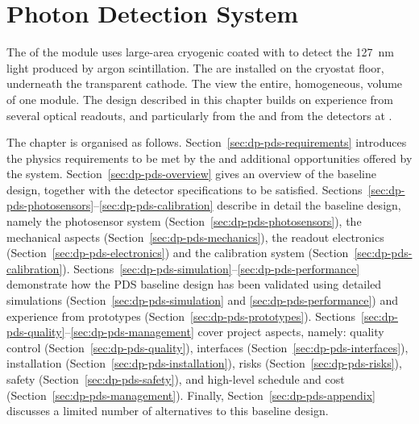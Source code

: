 \chapter{Photon Detection System}
\label{ch:dp-pds}

The  of the \dune \dual module uses large-area cryogenic  coated with  to detect the \SI{127}{\nm} light produced by argon scintillation. The  are installed on the cryostat floor, underneath the  transparent cathode. The   view the entire, homogeneous,  volume of one  module. The design described in this chapter builds on experience from several \lartpc optical readouts, and particularly from the  and from the  detectors at . 

The chapter is organised as follows. Section~\ref{sec:dp-pds-requirements} introduces the physics requirements to be met by the  and additional opportunities offered by the system. Section~\ref{sec:dp-pds-overview} gives an overview of the  baseline design, together with the detector specifications to be satisfied. Sections~\ref{sec:dp-pds-photosensors}--\ref{sec:dp-pds-calibration} describe in detail the  baseline design, namely the  photosensor system (Section~\ref{sec:dp-pds-photosensors}), the mechanical aspects (Section~\ref{sec:dp-pds-mechanics}),  the readout electronics (Section~\ref{sec:dp-pds-electronics}) and the calibration system (Section~\ref{sec:dp-pds-calibration}). Sections~\ref{sec:dp-pds-simulation}--\ref{sec:dp-pds-performance} demonstrate how the PDS baseline design has been validated using detailed simulations (Section~\ref{sec:dp-pds-simulation} and \ref{sec:dp-pds-performance}) and experience from prototypes (Section~\ref{sec:dp-pds-prototypes}). Sections~\ref{sec:dp-pds-quality}--\ref{sec:dp-pds-management} cover  project aspects, namely: quality control (Section~\ref{sec:dp-pds-quality}), interfaces (Section~\ref{sec:dp-pds-interfaces}), installation (Section~\ref{sec:dp-pds-installation}), risks (Section~\ref{sec:dp-pds-risks}), safety (Section~\ref{sec:dp-pds-safety}), and high-level schedule and cost (Section~\ref{sec:dp-pds-management}). Finally, Section~\ref{sec:dp-pds-appendix} discusses a limited number of alternatives to this baseline design.  
















